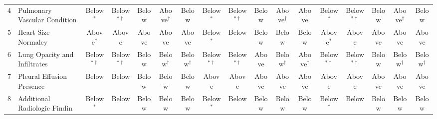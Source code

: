 \begin{landscape}
\begin{table}[p]
\begin{tabular}{rlccccccccccccccc}
4 & Pulmonary Vascular Condition & \cellcolor{red!15}Below$^{\ast}$ & \cellcolor{red!15}Below$^{\ast\dagger}$ & \cellcolor{red!15}Below & \cellcolor{blue!15}Above$^{\dagger}$ & \cellcolor{red!15}Below & \cellcolor{red!15}Below$^{\ast}$ & \cellcolor{red!15}Below$^{\ast\dagger}$ & \cellcolor{red!15}Below & \cellcolor{blue!15}Above$^{\dagger}$ & \cellcolor{blue!15}Above & \cellcolor{red!15}Below$^{\ast}$ & \cellcolor{red!15}Below$^{\ast\dagger}$ & \cellcolor{red!15}Below & \cellcolor{blue!15}Above$^{\dagger}$ & \cellcolor{red!15}Below \\
5 & Heart Size Normalcy & \cellcolor{blue!15}Above$^{\ast}$ & \cellcolor{blue!15}Above & \cellcolor{blue!15}Above & \cellcolor{blue!15}Above & \cellcolor{blue!15}Above & \cellcolor{red!15}Below$^{\ast}$ & \cellcolor{red!15}Below & \cellcolor{red!15}Below & \cellcolor{red!15}Below & \cellcolor{red!15}Below & \cellcolor{blue!15}Above$^{\ast}$ & \cellcolor{blue!15}Above & \cellcolor{blue!15}Above & \cellcolor{blue!15}Above & \cellcolor{blue!15}Above \\
6 & Lung Opacity and Infiltrates & \cellcolor{red!15}Below$^{\ast\dagger}$ & \cellcolor{red!15}Below$^{\ast\dagger}$ & \cellcolor{red!15}Below & \cellcolor{red!15}Below$^{\dagger}$ & \cellcolor{red!15}Below$^{\dagger}$ & \cellcolor{red!15}Below$^{\ast\dagger}$ & \cellcolor{red!15}Below$^{\ast\dagger}$ & \cellcolor{blue!15}Above & \cellcolor{red!15}Below$^{\dagger}$ & \cellcolor{blue!15}Above$^{\dagger}$ & \cellcolor{red!15}Below$^{\ast\dagger}$ & \cellcolor{red!15}Below$^{\ast\dagger}$ & \cellcolor{red!15}Below & \cellcolor{red!15}Below$^{\dagger}$ & \cellcolor{red!15}Below$^{\dagger}$ \\
7 & Pleural Effusion Presence & \cellcolor{red!15}Below & \cellcolor{red!15}Below & \cellcolor{red!15}Below & \cellcolor{red!15}Below & \cellcolor{red!15}Below & \cellcolor{blue!15}Above & \cellcolor{blue!15}Above & \cellcolor{blue!15}Above & \cellcolor{blue!15}Above & \cellcolor{blue!15}Above & \cellcolor{blue!15}Above & \cellcolor{blue!15}Above & \cellcolor{blue!15}Above & \cellcolor{blue!15}Above & \cellcolor{blue!15}Above \\
8 & Additional Radiologic Findin & \cellcolor{red!15}Below$^{\ast}$ & \cellcolor{red!15}Below & \cellcolor{red!15}Below & \cellcolor{red!15}Below & \cellcolor{red!15}Below & \cellcolor{red!15}Below$^{\ast}$ & \cellcolor{red!15}Below & \cellcolor{red!15}Below & \cellcolor{red!15}Below & \cellcolor{red!15}Below & \cellcolor{red!15}Below$^{\ast}$ & \cellcolor{red!15}Below & \cellcolor{red!15}Below & \cellcolor{red!15}Below & \cellcolor{red!15}Below \\

\end{tabular}
\end{table}
\end{landscape}
